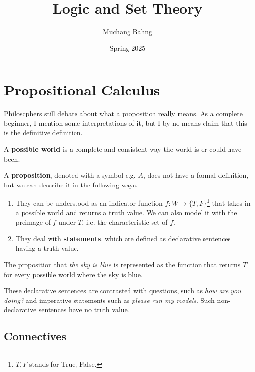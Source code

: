 \documentclass{article}
\begin{document}
\title{Logic and Set Theory}
\author{Muchang Bahng}
\date{Spring 2025}

\maketitle
\tableofcontents
\pagebreak

\section{Propositional Calculus} 

  Philosophers still debate about what a proposition really means. As a complete beginner, I mention some interpretations of it, but I by no means claim that this is the definitive definition. 

  \begin{definition}
    A \textbf{possible world} is a complete and consistent way the world is or could have been. 
  \end{definition}

  \begin{definition}[Proposition]
    A \textbf{proposition}, denoted with a symbol e.g. $A$, does not have a formal definition, but we can describe it in the following ways.  
    \begin{enumerate}
      \item They can be understood as an indicator function $f: W \rightarrow \{T, F\}$\footnote{$T, F$ stands for True, False.} that takes in a possible world and returns a truth value. We can also model it with the preimage of $f$ under $T$, i.e. the characteristic set of $f$. 
      \item They deal with \textbf{statements}, which are defined as declarative sentences having a truth value. 
    \end{enumerate}
  \end{definition}

  \begin{example}
    The proposition that \textit{the sky is blue} is represented as the function that returns $T$ for every possible world where the sky is blue. 
  \end{example}

  These declarative sentences are contrasted with questions, such as \textit{how are you doing?} and imperative statements such as \textit{please run my models}. Such non-declarative sentences have no truth value.  

  \subsection{Connectives}
\end{document}
